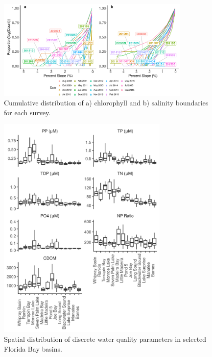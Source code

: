\clearpage

\begin{figure}
  \centering
  \includegraphics[width=0.85\textwidth]{../../figures/boundaries.png}
  \caption{Cumulative distribution of a) chlorophyll and b) salinity boundaries for each survey.}
  \label{fig:6}
\end{figure}

\clearpage



\clearpage

\begin{figure}
  \centering
  \includegraphics[width=0.75\textwidth]{../../figures/nonchlboxplot.png}
  \caption{Spatial distribution of discrete water quality parameters in selected Florida Bay basins.}
  \label{fig:7}
\end{figure}

